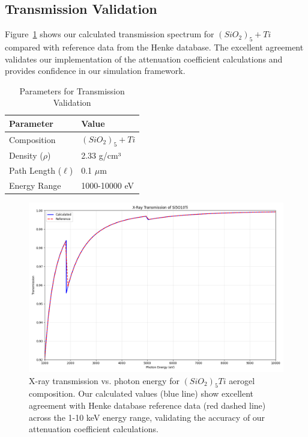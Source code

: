 \documentclass[twocolumn]{aastex701}
\begin{document}
\subsection{Transmission Validation}

Figure~\ref{fig:energy} shows our calculated transmission spectrum for $(SiO_2)_5+Ti$ compared with reference data from the Henke database. The excellent agreement validates our implementation of the attenuation coefficient calculations and provides confidence in our simulation framework.

\begin{table}[h!]
\centering
\caption{Parameters for Transmission Validation}
\begin{tabular}{ll}
\hline
\textbf{Parameter} & \textbf{Value} \\
\hline
Composition & $(SiO_2)_5+Ti$ \\
Density ($\rho$) & 2.33 g/cm³ \\
Path Length ($\ell$) & 0.1 $\mu$m \\
Energy Range & 1000-10000 eV \\
\hline
\end{tabular}
\label{tab:transmission}
\end{table}

\begin{figure}[htbp]
  \centering
  \includegraphics[width=\linewidth]{energy_vs_transmission.png}
  \caption{X-ray transmission vs. photon energy for $(SiO_2)_5Ti$ aerogel composition. Our calculated values (blue line) show excellent agreement with Henke database reference data (red dashed line) across the 1-10 keV energy range, validating the accuracy of our attenuation coefficient calculations.}
  \label{fig:energy}
\end{figure}
\end{document}
